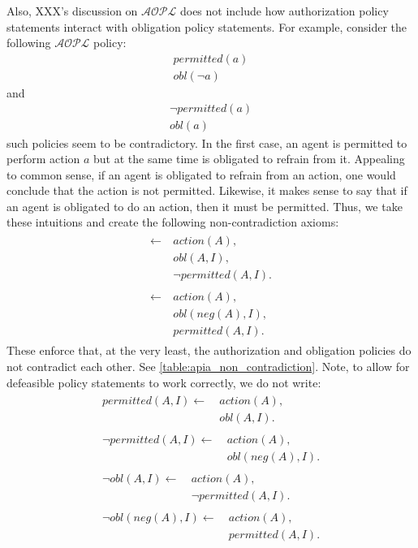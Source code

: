 Also, XXX's discussion on $\mathcal{AOPL}$ does not include how authorization policy statements interact with obligation policy statements.
For example, consider the following $\mathcal{AOPL}$ policy:
\begin{gather}
    permitted(a) \\
    obl(\neg a)
\end{gather}
and
\begin{gather}
    \neg permitted(a) \\
    obl(a)
\end{gather}
such policies seem to be contradictory.
In the first case, an agent is permitted to perform action $a$ but at the same time is obligated to refrain from it.
Appealing to common sense, if an agent is obligated to refrain from an action, one would conclude that the action is not permitted.
Likewise, it makes sense to say that if an agent is obligated to do an action, then it must be permitted.
Thus, we take these intuitions and create the following non-contradiction axioms:
\begin{gather}
    \begin{split}
        \leftarrow \
            & action(A), \\
            & obl(A, I), \\
            & \neg permitted(A, I).
    \end{split} \\
    \begin{split}
        \leftarrow \
            & action(A), \\
            & obl(neg(A), I), \\
            & permitted(A, I).
    \end{split}
\end{gather}
These enforce that, at the very least, the authorization and obligation policies do not contradict each other.
See \cref{table:apia_non_contradiction}.
Note, to allow for defeasible policy statements to work correctly, we do not write:
\begin{gather}
    \begin{split}
        permitted(A, I) \leftarrow \
            & action(A), \\
            & obl(A, I).
    \end{split} \\
    \begin{split}
        \neg permitted(A, I) \leftarrow \
            & action(A), \\
            & obl(neg(A), I).
    \end{split} \\
    \begin{split}
        \neg obl(A, I) \leftarrow \
            & action(A), \\
            & \neg permitted(A, I).
    \end{split} \\
    \begin{split}
        \neg obl(neg(A), I) \leftarrow \
            & action(A), \\
            & permitted(A, I).
    \end{split}
\end{gather}

